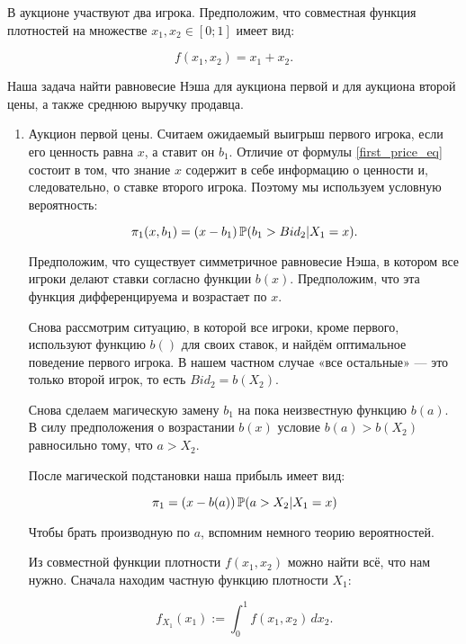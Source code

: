 В аукционе участвуют два игрока. Предположим, что совместная функция плотностей на множестве $ x_{1},x_{2}\in [0;1] $ имеет вид:

\begin{equation}
f(x_{1},x_{2})=x_{1}+x_{2}.
\end{equation}

Наша задача найти равновесие Нэша для аукциона первой и для аукциона второй цены, а также среднюю выручку продавца.

\begin{enumerate}
\item Аукцион первой цены. Считаем ожидаемый выигрыш первого игрока, если его ценность равна $ x $, а ставит он $ b_{1} $. Отличие от формулы \ref{first_price_eq} состоит в том, что знание $ x $ содержит в себе информацию о ценности и, следовательно, о ставке второго игрока. Поэтому мы используем условную вероятность:

\begin{equation}
\pi_{1}(x,b_{1})=(x-b_{1})\P(b_{1}>Bid_{2} |X_{1}=x).
\end{equation}

Предположим, что существует симметричное равновесие Нэша, в котором все игроки делают ставки согласно функции $ b(x) $. Предположим, что эта функция дифференцируема и возрастает по $ x $.

Снова рассмотрим ситуацию, в которой все игроки, кроме первого, используют функцию $ b() $ для своих ставок, и найдём оптимальное поведение первого игрока. В нашем частном случае «все остальные» — это только второй игрок, то есть $ Bid_{2}=b(X_{2}) $.

Снова сделаем магическую замену $ b_{1} $ на пока неизвестную функцию $ b(a) $. В силу предположения о возрастании  $ b(x) $ условие $ b(a)>b(X_{2}) $ равносильно тому, что $ a>X_{2} $.

После магической подстановки наша прибыль имеет вид:

\begin{equation}
\pi_{1}=(x-b(a))\P(a>X_{2} |X_{1}=x)
\end{equation}


Чтобы брать производную по $a$, вспомним немного теорию вероятностей.

Из совместной функции плотности $f(x_{1}, x_{2})$ можно найти всё, что нам нужно. Сначала находим частную функцию плотности $X_{1}$:

\begin{equation}
f_{X_{1}}(x_{1}):=\int_{0}^{1} f(x_{1},x_{2}) \, dx_{2}.
\end{equation}


\end{enumerate}
